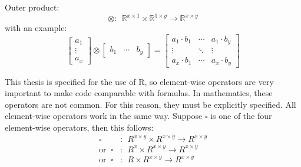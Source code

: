\documentclass[
  oneside]{book}
\begin{document}
Outer product:
\[\otimes: \ \ \mathbb{R}^{x \times 1} \times \mathbb{R}^{1 \times y} \rightarrow \mathbb{R}^{x \times y} \]
with an example:
\[
\begin{bmatrix}a_{1}\\ \vdots \\ a_{x}\end{bmatrix}
\otimes
\begin{bmatrix}b_{1} &\cdots  & b_{y}\end{bmatrix}
=
\begin{bmatrix}a_{1} \cdot b_{1} &\cdots  & a_{1} \cdot b_{y} \\ \vdots & \ddots & \vdots  \\ a_{x} \cdot b_{1}  & \cdots & a_{x} \cdot b_{y} \end{bmatrix}
\]

This thesis is specified for the use of R, so element-wise operators are very important to make code comparable with formulas. In mathematics, these operators are not common. For this reason, they must be explicitly specified. All element-wise operators work in the same way. Suppose \(\square\) is one of the four element-wise operators, then this follows:
\begin{align*}
\square &: \ \ R^{x \times y} \times R^{x \times y}  \rightarrow R^{x \times y}\\
\text{or }\ \square &: \ \ R^{x} \times R^{x \times y}  \rightarrow R^{x \times y}\\
\text{or }\ \square &: \ \ R \times R^{x \times y}  \rightarrow R^{x \times y}
\end{align*}
\end{document}
